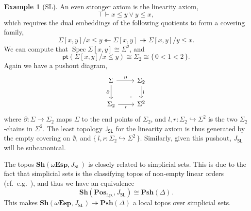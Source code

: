 \documentclass[a4paper,12pt]{amsart}
\theoremstyle{definition}
\newtheorem{example}[theorem]{Example}
\newcommand{\mb}[1]{\mathbf{#1}}
\newcommand{\mr}[1]{\mathrm{#1}}
\newcommand{\ms}[1]{\mathsf{#1}}
\newcommand{\Pos}{\mb{Pos}}
\newcommand{\sh}{\mb{Sh}}
\newcommand{\psh}{\mb{Psh}}
\newcommand{\set}[1]{\{\,#1\,\}}
\newcommand{\surj}{\twoheadrightarrow}
\newcommand{\hook}{\hookrightarrow}
\newcommand{\fp}{_{\mr{f.p.}}}
\newcommand{\emp}{\emptyset}
\newcommand{\pt}{\ms{pt}}
\newcommand{\wTop}{\omega\mb{Esp}}
\newcommand{\spec}{\operatorname{Spec}}
\begin{document}
\begin{example}[SL]
  An even stronger axiom is the linearity axiom, 
  \[ \top \vdash x \le y \vee y \le x, \]
  which requires the dual embeddings of the following quotients to form a covering family,
  \[ \Sigma[x,y]/x \le y \twoheadleftarrow \Sigma[x,y] \surj \Sigma[x,y]/y \le x. \]
  We can compute that $\spec \Sigma[x,y] \cong \Sigma^2$, and 
  \[ \pt(\Sigma[x,y]/x \le y) \cong \Sigma_2 \cong \set{0 < 1 < 2}. \]
  Again we have a pushout diagram,
  \[
  \begin{tikzcd}
    \Sigma \ar[r, "\partial"] \ar[d, "\partial"'] & \Sigma_2 \ar[d, "l"] \\ 
    \Sigma_2 \ar[r, "r"'] & \Sigma^2
    \arrow["\lrcorner"{anchor=center, pos=0.125, rotate=180}, draw=none, from=2-2, to=1-1]
  \end{tikzcd}
  \]
  where $\partial : \Sigma \to \Sigma_2$ maps $\Sigma$ to the end points of $\Sigma_2$, and $l,r : \Sigma_2 \hook \Sigma^2$ is the two $\Sigma_2$-chains in $\Sigma^2$. The least topology $\ms J_{\ms{SL}}$ for the linearity axiom is thus generated by the empty covering on $\emp$, and $\set{l,r : \Sigma_2 \hook \Sigma^2}$. Similarly, given this pushout, $J_{\ms{SL}}$ will be subcanonical.

  The topos $\sh(\wTop,J_{\ms{SL}})$ is closely related to simplicial sets. This is due to the fact that simplicial sets is the classifying topos of non-empty linear orders (cf.\ e.g.~\cite[VIII. 8]{maclane1992sheaves}), and thus we have an equivalence 
  \[ \sh(\Pos\fp,J_{\ms{SL}}) \cong \psh(\Delta). \]
  This makes $\sh(\wTop,J_{\ms{SL}}) \surj \psh(\Delta)$ a local topos over simplicial sets.
\end{example}
\end{document}
